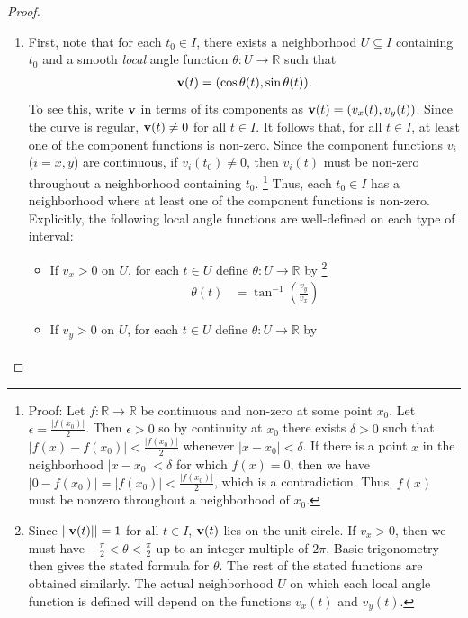 \documentclass[12pt,letterpaper,reqno]{article}
\numberwithin{equation}{section}
\newcommand{\R}{\ensuremath{\mathbb R}}
\newcommand{\bv}{{\bf v}}
\newcommand{\fixme}[1]{{\color{orange}{[#1]}}}
\begin{document}
{\begin{proof} \hspace{15cm}
	\begin{enumerate}
		\item First, note that for each $t_0 \in I$, there exists a neighborhood $U \subseteq I$ containing $t_0$ and a smooth \emph{local} angle function $\theta:U \to \R$ such that 
		\begin{align*}
			\bv(t)=(\cos \theta(t),\sin \theta(t)).
		\end{align*}
		To see this, write $\bv$ in terms of its components as $\bv(t)=(v_x(t),v_y(t))$. Since the curve is regular, $\bv(t) \neq 0$ for all $t \in I$. It follows that, for all $t \in I$, at least one of the component functions is non-zero. Since the component functions $v_i$ ($i=x,y$) are continuous, if $v_i(t_0) \neq 0$, then $v_i(t)$ must be non-zero throughout a neighborhood containing $t_0$. \footnote{Proof: Let $f:\R \to \R$ be continuous and non-zero at some point $x_0$. Let $\epsilon=\frac{|f(x_0)|}{2}$. Then $\epsilon>0$ so by continuity at $x_0$ there exists $\delta>0$ such that $|f(x)-f(x_0)|<\frac{|f(x_0)|}{2}$ whenever $|x-x_0|<\delta$. If there is a point $x$ in the neighborhood $|x-x_0|<\delta$ for which $f(x)=0$, then we have $|0-f(x_0)|=|f(x_0)|<\frac{|f(x_0)|}{2}$, which is a contradiction. Thus, $f(x)$ must be nonzero throughout a neighborhood of $x_0$.} Thus, each $t_0 \in I$ has a neighborhood where at least one of the component functions is non-zero. Explicitly, the following local angle functions are well-defined on each type of interval: \fixme{Add explanation of how to get (or at least verify) these. Maybe add a figure?}
		\begin{itemize}
			\item If $v_x>0$ on $U$, for each $t \in U$ define $\theta:U \to \R$ by \footnote{Since $||\bv(t)||=1$ for all $t \in I$, $\bv(t)$ lies on the unit circle. If $v_x>0$, then we must have $-\frac{\pi}{2}<\theta<\frac{\pi}{2}$ up to an integer multiple of $2\pi$. Basic trigonometry then gives the stated formula for $\theta$. The rest of the stated functions are obtained similarly. The actual neighborhood $U$ on which each local angle function is defined will depend on the functions $v_x(t)$ and $v_y(t)$.}
			\begin{align*}
				\theta(t)&=\tan^{-1}(\frac{v_y}{v_x})
			\end{align*}
			\item If $v_y>0$ on $U$, for each $t \in U$ define $\theta:U \to \R$ by
			\begin{align*}

\end{align*}
\end{itemize}
\end{enumerate}
\end{proof}}
\end{document}
